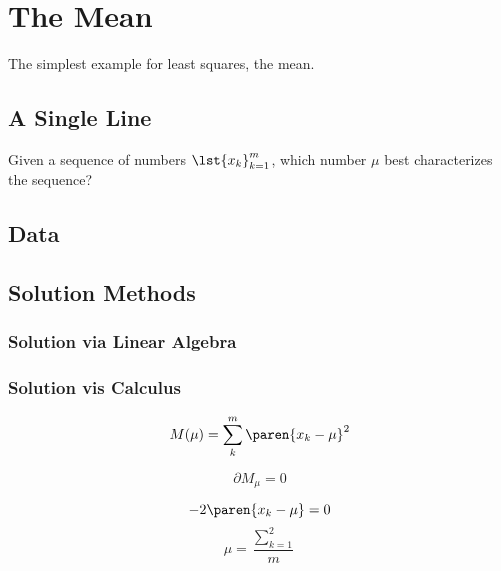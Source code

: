 \chapter{The Mean}

The simplest example for least squares, the mean.

\section{A Single Line}  %
Given a sequence of numbers $\lst{x_{k}}_{k=1}^{m}$, which number $\mu$ best characterizes the sequence?

\section{Data}  %

\section{Solution Methods}  %

\subsection{Solution via Linear Algebra}  %
\subsection{Solution vis Calculus}  %
%
\begin{equation}
    M(\mu) = \sum_{k}^{m} \paren{ x_{k} - \mu }^2
\end{equation}
%

%
\begin{equation}
    \partial M_{\mu} = 0
\end{equation}
%

%
\begin{equation}
    -2 \paren{ x_{k} - \mu } = 0
\end{equation}
%
%
\begin{equation}
    \mu = \frac{\sum_{k=1}^{2}} {m}
\end{equation}
%
\endinput   %